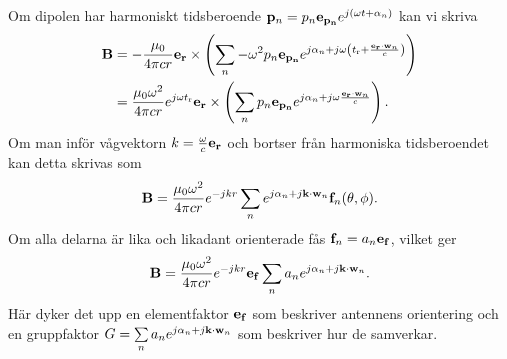 Om dipolen har harmoniskt tidsberoende $\vb{p}_{n} = p_{n}\vb{e}_{\vb{p_{n}}}e^{j(\omega t + \alpha_{n})}$ kan vi skriva
\begin{align*}
	\vb{B} &= -\frac{\mu_{0}}{4\pi cr}\vb{e}_{\vb{r}}\times\left(\sum\limits_{n}-\omega^{2}p_{n}\vb{e}_{\vb{p_{n}}}e^{j\alpha_{n} + j\omega\left(t_{\text{r}} + \frac{\vb{e}_{\vb{r}}\cdot\vb{w}_{n}}{c}\right)}\right) \\
	       &= \frac{\mu_{0}\omega^{2}}{4\pi cr}e^{j\omega t_{\text{r}}}\vb{e}_{\vb{r}}\times\left(\sum\limits_{n}p_{n}\vb{e}_{\vb{p_{n}}}e^{j\alpha_{n} + j\omega\frac{\vb{e}_{\vb{r}}\cdot\vb{w}_{n}}{c}}\right).
\end{align*}
Om man inför vågvektorn $k = \frac{\omega}{c}\vb{e}_{\vb{r}}$ och bortser från harmoniska tidsberoendet kan detta skrivas som
\begin{align*}
	\vb{B} = \frac{\mu_{0}\omega^{2}}{4\pi cr}e^{-jkr}\sum\limits_{n}e^{j\alpha_{n} + j\vb{k}\cdot\vb{w}_{n}}\vb{f}_{n}(\theta, \phi).
\end{align*}
Om alla delarna är lika och likadant orienterade fås $\vb{f}_{n} = a_{n}\vb{e}_{\vb{f}}$, vilket ger
\begin{align*}
	\vb{B} = \frac{\mu_{0}\omega^{2}}{4\pi cr}e^{-jkr}\vb{e}_{\vb{f}}\sum\limits_{n}a_{n}e^{j\alpha_{n} + j\vb{k}\cdot\vb{w}_{n}}.
\end{align*}
Här dyker det upp en elementfaktor $\vb{e}_{\vb{f}}$ som beskriver antennens orientering och en gruppfaktor $G = \sum\limits_{n}a_{n}e^{j\alpha_{n} + j\vb{k}\cdot\vb{w}_{n}}$ som beskriver hur de samverkar.